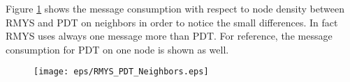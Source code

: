 Figure \ref{fig:RMYS_PDT_Neighbors} shows the message consumption with respect to node density between RMYS and PDT on neighbors in order to notice the small differences.
In fact RMYS uses always one message more than PDT.
For reference, the message consumption for PDT on one node is shown as well.

\begin{figure}[h!]
\centering
\texttt{[image: eps/RMYS\_PDT\_Neighbors.eps]}
\caption{}
\label{fig:RMYS_PDT_Neighbors}
\end{figure}

%
%
%
%
%
%
%
%
%
